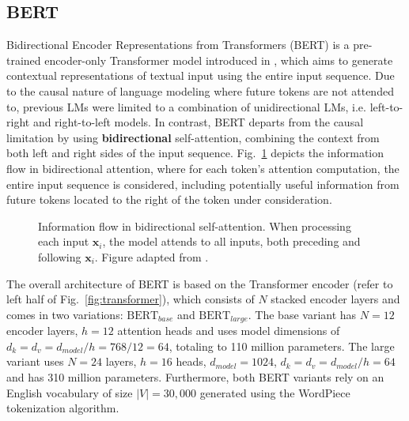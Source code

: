 \subsection{BERT} \label{sec:bert}

Bidirectional Encoder Representations from Transformers (BERT) is a pre-trained
encoder-only Transformer model introduced in \cite{devlin2019bert}, which aims
to generate contextual representations of textual input using the entire input
sequence. Due to the causal nature of language modeling where future tokens are
not attended to, previous LMs were limited to a combination of unidirectional
LMs, i.e. left-to-right and right-to-left models. In contrast, BERT departs from
the causal limitation by using \textbf{bidirectional} self-attention, combining
the context from both left and right sides of the input sequence.
Fig.~\ref{fig:bidirectional_attention} depicts the information flow in
bidirectional attention, where for each token's attention computation, the
entire input sequence is considered, including potentially useful information
from future tokens located to the right of the token under consideration. 

\begin{figure}[htb]
    \centering
    \resizebox*{.8\textwidth}{!}{}
    \caption[Information flow in bidirectional self-attention]{Information flow
    in bidirectional self-attention. When processing each input $\bm{x}_{i}$,
    the model attends to all inputs, both preceding and following $\bm{x}_{i}$.
    Figure adapted from \cite{jurafsky2025slp}.}
    \label{fig:bidirectional_attention}
\end{figure}

The overall architecture of BERT is based on the Transformer encoder (refer to
left half of Fig.~\ref{fig:transformer}), which consists of $N$ stacked encoder
layers and comes in two variations: $\text{BERT}_{base}$ and
$\text{BERT}_{large}$. The base variant has $N = 12$ encoder layers, $h = 12$
attention heads and uses model dimensions of $d_k = d_v = d_{model} / h = 768 /
12 = 64$, totaling to 110 million parameters. The large variant uses $N = 24$
layers, $h = 16$ heads, $d_{model} = 1024$, $d_k = d_v = d_{model} / h = 64$ and
has 310 million parameters. Furthermore, both BERT variants rely on an English
vocabulary of size $|V| = 30,000$ generated using the WordPiece tokenization
algorithm.

